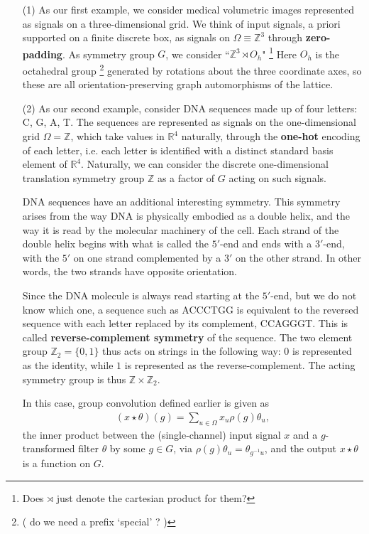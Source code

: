 \documentclass[12pt]{article}
\numberwithin{equation}{section}
\theoremstyle{definition}
\newcommand{		\Z		}	{	\mathbb{Z}				}
\newcommand{		\eq		}[1]	{	\begin{align*}#1\end{align*}	}%
\newcommand{		\B		}	{\textbf					} %
\newcommand{		\Oh		}	{	\Omega					}
\newcommand{		\1		}	{	\bm{1}					}%
\begin{document}
\begin{itemize}
\item[(1)] As our first example, we consider medical volumetric images represented as signals on a three-dimensional grid. We think of input signals, a priori supported on a finite discrete box, as signals on $\Oh \equiv \Z^3$ through \B{zero-padding}. As symmetry group $G$, we consider ``$\mathbb{Z}^3 \rtimes O_h$" \footnote{ Does $\rtimes$ just denote the cartesian product for them? } Here $O_h$ is the octahedral group \footnote{( do we need a prefix `special' ? ) } generated by rotations about the three coordinate axes, so these are all orientation-preserving graph automorphisms of the lattice.  
\item[(2)] As our second example, consider DNA sequences made up of four letters: C, G, A, T. The sequences are represented as signals on the one-dimensional grid $\Oh = \Z$, which take values in $\mathbb{R}^4$ naturally, through the \B{one-hot} encoding of each letter, i.e. each letter is identified with a distinct standard basis element of $\mathbb{R}^4$. Naturally, we can consider the discrete one-dimensional translation symmetry group $\mathbb{Z}$ as a factor of $G$ acting on such signals. 

DNA sequences have an additional interesting symmetry. This symmetry arises from the way DNA is physically embodied as a double helix, and the way it is read by the molecular machinery of the cell. Each strand of the double helix begins with what is called the $5'$-end and ends with a $3'$-end, with the $5'$ on one strand complemented by a $3'$ on the other strand. In other words, the two strands have opposite orientation.

Since the DNA molecule is always read starting at the $5'$-end, but we do not know which one, a sequence such as ACCCTGG is equivalent to the reversed sequence with each letter replaced by its complement, CCAGGGT. This is called \B{reverse-complement symmetry} of the sequence. The two element group $\mathbb{Z}_2 = \{0,1\}$ thus acts on strings in the following way: $0$ is represented as the identity, while $1$ is represented as the reverse-complement. The acting symmetry group is thus $\mathbb{Z} \times \mathbb{Z}_2$. 

In this case, group convolution defined earlier is given as
\eq{
(x \star \theta) (g)  = \sum_{u \in \Oh} x_u \rho(g) \theta_u,
}
the inner product between the (single-channel) input signal $x$ and a $g$-transformed filter $\theta$ by some $g \in G$, via $\rho(g) \theta_u = \theta_{g^{-1} u }$, and the output $x \star \theta$ is a function on $G$. 
\end{itemize}
\end{document}
